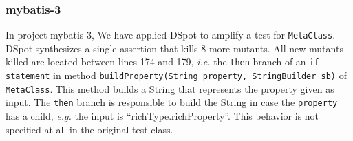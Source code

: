 \documentclass[table,xcdraw,smallextended]{svjour3}
\newcommand{\ie}{\textit{i.e.}\xspace}
\newcommand{\eg}{\textit{e.g.}\xspace}
\newcommand{\dspot}{DSpot\xspace}
\newcommand{\pitest}{Pitest\xspace}
\begin{document}
\subsubsection{mybatis-3}


In project mybatis-3, We have applied \dspot to amplify a test for \texttt{MetaClass}. \dspot synthesizes a single assertion that kills 8 more mutants.
All new mutants killed are located between lines 174 and 179, \ie the \texttt{then} branch of an \texttt{if-statement} in method \texttt{buildProperty(String property, StringBuilder sb)} of \texttt{MetaClass}.
This method builds a String that represents the  property given as input. The  \texttt{then} branch is responsible to build  the String in case the \texttt{property} has a child, \eg the input is ``richType.richProperty''. This behavior is not specified at all in the original test class.
\end{document}
